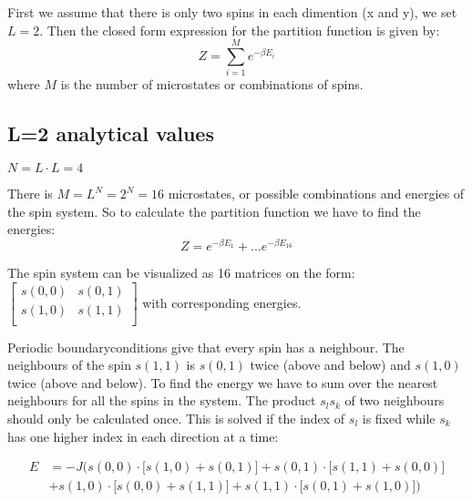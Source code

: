 \documentclass[11pt,a4wide]{article}
\begin{document}
First we assume that there is only two spins in each dimention (x and y), we set $L=2$. Then the closed form expression for the partition function is given by:
\[
Z = \sum_{i=1}^M e^{-\beta E_i}
\]
where $M$ is the number of microstates or combinations of spins.


\subsection{L=2 analytical values}

$N = L\cdot L = 4$

There is $M= L^N = 2^N = 16$ microstates, or possible combinations and energies of the spin system. So to calculate the partition function we have to find the energies:
\[
Z = e^{-\beta E_1} + ... e^{-\beta E_{16}}
\]

The spin system can be visualized as 16 matrices on the form:
$\left[ \begin{array}{cc} s(0,0) & s(0,1) \\
                             	    s(1,0)  & s(1,1) \\
\end{array} \right]$
with corresponding energies. 

Periodic boundaryconditions give that every spin has a neighbour. The neighbours of the spin $s(1,1)$ is  $s(0,1)$ twice (above and below) and $s(1,0)$ twice (above and below). To find the energy we have to sum over the nearest neighbours for all the spins in the system. The product $s_ls_k$ of two neighbours should only be calculated once. This is solved if the index of $s_l$ is fixed while $s_k$ has one higher index in each direction at a time:

\begin{align}
E &= -J\bigg( s(0,0)\cdot \big[s(1,0) + s(0,1) \big] + s(0,1)\cdot\big[s(1,1) + s(0,0) \big] \nonumber   \\ 
 &+ s(1,0)\cdot\big[s(0,0) + s(1,1) \big] + s(1,1)\cdot\big[s(0,1) + s(1,0) \big] \bigg)
 \label{eq: energy spins}
\end{align}
\end{document}

